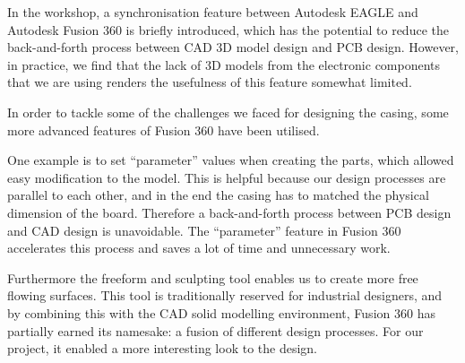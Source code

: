 In the workshop, a synchronisation feature between Autodesk EAGLE and Autodesk Fusion 360 is briefly introduced, which has the potential to reduce the back-and-forth process between CAD 3D model design and PCB design. However, in practice, we find that the lack of 3D models from the electronic components that we are using renders the usefulness of this feature somewhat limited.

In order to tackle some of the challenges we faced for designing the casing, some more advanced features of Fusion 360 have been utilised.

One example is to set “parameter” values when creating the parts, which allowed easy modification to the model. This is helpful because our design processes are parallel to each other, and in the end the casing has to matched the physical dimension of the board. Therefore a back-and-forth process between PCB design and CAD design is unavoidable. The “parameter” feature in Fusion 360 accelerates this process and saves a lot of time and unnecessary work.

Furthermore the freeform and sculpting tool enables us to create more free flowing surfaces. This tool is traditionally reserved for industrial designers, and by combining this with the CAD solid modelling environment, Fusion 360 has partially earned its namesake: a fusion of different design processes. For our project, it enabled a more interesting look to the design.

\FloatBarrier
\vspace{1cm}


